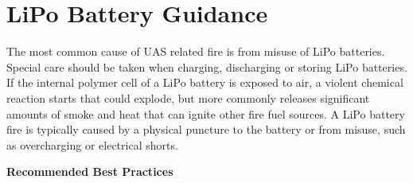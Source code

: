 \documentclass[
]{book}
\begin{document}
\hypertarget{lipo-battery-guidance}{%
\section{LiPo Battery Guidance}\label{lipo-battery-guidance}}

The most common cause of UAS related fire is from misuse of LiPo batteries. Special care should be taken when charging, discharging or storing LiPo batteries. If the internal polymer cell of a LiPo battery is exposed to air, a violent chemical reaction starts that could explode, but more commonly releases significant amounts of smoke and heat that can ignite other fire fuel sources. A LiPo battery fire is typically caused by a physical puncture to the battery or from misuse, such as overcharging or electrical shorts.

\textbf{Recommended Best Practices}
\end{document}
